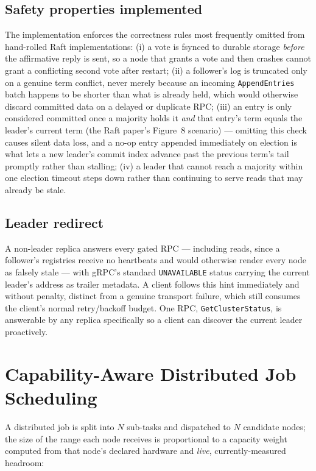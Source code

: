\documentclass[conference]{IEEEtran}
\begin{document}
\subsection{Safety properties implemented}

The implementation enforces the correctness rules most frequently omitted from hand-rolled Raft
implementations: (i) a vote is fsynced to durable storage \emph{before} the affirmative reply is sent,
so a node that grants a vote and then crashes cannot grant a conflicting second vote after restart;
(ii) a follower's log is truncated only on a genuine term conflict, never merely because an incoming
\texttt{AppendEntries} batch happens to be shorter than what is already held, which would otherwise
discard committed data on a delayed or duplicate RPC; (iii) an entry is only considered committed once
a majority holds it \emph{and} that entry's term equals the leader's current term (the Raft paper's
Figure~8 scenario) — omitting this check causes silent data loss, and a no-op entry appended
immediately on election is what lets a new leader's commit index advance past the previous term's tail
promptly rather than stalling; (iv) a leader that cannot reach a majority within one election timeout
steps down rather than continuing to serve reads that may already be stale.

\subsection{Leader redirect}

A non-leader replica answers every gated RPC — including reads, since a follower's registries receive
no heartbeats and would otherwise render every node as falsely stale — with gRPC's standard
\texttt{UNAVAILABLE} status carrying the current leader's address as trailer metadata. A client
follows this hint immediately and without penalty, distinct from a genuine transport failure, which
still consumes the client's normal retry/backoff budget. One RPC, \texttt{GetClusterStatus}, is
answerable by any replica specifically so a client can discover the current leader proactively.

\section{Capability-Aware Distributed Job Scheduling}
\label{sec:capacity}

A distributed job is split into $N$ sub-tasks and dispatched to $N$ candidate nodes; the size of the
range each node receives is proportional to a capacity weight computed from that node's declared
hardware and \emph{live}, currently-measured headroom:
\end{document}
